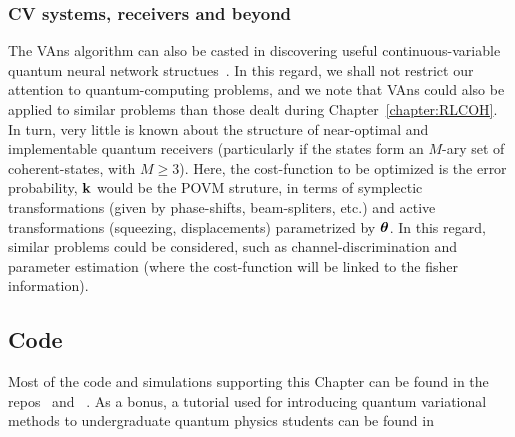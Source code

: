 \subsubsection{CV systems, receivers and beyond}
The VAns algorithm can also be casted in discovering useful continuous-variable quantum neural network structues~\cite{cvnetworks}. In this regard, we shall not restrict our attention to quantum-computing problems, and we note that VAns could also be applied to similar problems than those dealt during Chapter~\ref{chapter:RLCOH}. In turn, very little is known about the structure of near-optimal and implementable quantum receivers (particularly if the states form an $M$-ary set of coherent-states, with $M\geq3$). Here, the cost-function to be optimized is the error probability, $\mathbf{k}$ would be the POVM struture, in terms of symplectic transformations (given by phase-shifts, beam-spliters, etc.) and active transformations (squeezing, displacements) parametrized by $\bm{\theta}$. In this regard, similar problems could be considered, such as channel-discrimination and parameter estimation (where the cost-function will be linked to the fisher information).


\subsection{Code}
Most of the code and simulations supporting this Chapter can be found in the repos~\cite{Vansgb0} and ~\cite{Vansgb}. As a bonus, a tutorial used for introducing quantum variational methods to undergraduate quantum physics students can be found in~\cite{castellers}
